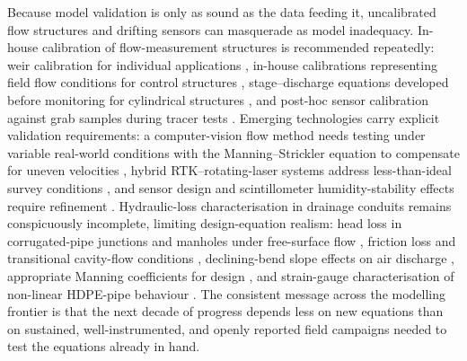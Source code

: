 \documentclass[11pt]{article}
\begin{document}
Because model validation is only as sound as the data feeding it, uncalibrated
flow structures and drifting sensors can masquerade as model inadequacy.
In-house calibration of flow-measurement structures is recommended repeatedly:
weir calibration for individual applications \parencite{Christianson2019,Napierala2023},
in-house calibrations representing field flow conditions for control structures
\parencite{Katuwal2024}, stage--discharge equations developed before monitoring
for cylindrical structures \parencite{BinShokrana2021}, and post-hoc sensor
calibration against grab samples during tracer tests \parencite{deOliveira2023b}.
Emerging technologies carry explicit validation requirements: a computer-vision
flow method needs testing under variable real-world conditions with the
Manning--Strickler equation to compensate for uneven velocities
\parencite{Young2023}, hybrid RTK--rotating-laser systems address
less-than-ideal survey conditions \parencite{Freeland2014}, and sensor design
and scintillometer humidity-stability effects require refinement
\parencite{Enamorado2007,Zhang2010}. Hydraulic-loss characterisation in drainage
conduits remains conspicuously incomplete, limiting design-equation realism:
head loss in corrugated-pipe junctions and manholes under free-surface flow
\parencite{Bayat2011}, friction loss and transitional cavity-flow conditions
\parencite{Nédélec2008}, declining-bend slope effects on air discharge
\parencite{Gurklys2008}, appropriate Manning coefficients for design
\parencite{Kouchakzadeh2011}, and strain-gauge characterisation of non-linear
HDPE-pipe behaviour \parencite{Gaj2021}. The consistent message across the
modelling frontier is that the next decade of progress depends less on new
equations than on sustained, well-instrumented, and openly reported field
campaigns needed to test the equations already in hand.

\printbibliography
\end{document}
